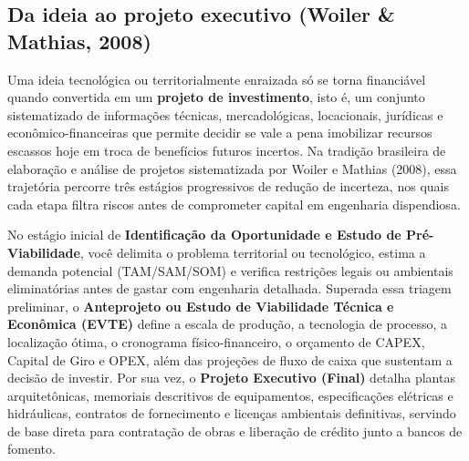 
\subsection{Da ideia ao projeto executivo (Woiler \& Mathias, 2008)}

Uma ideia tecnológica ou territorialmente enraizada só se torna financiável quando convertida em um \textbf{projeto de investimento}, isto é, um conjunto sistematizado de informações técnicas, mercadológicas, locacionais, jurídicas e econômico-financeiras que permite decidir se vale a pena imobilizar recursos escassos hoje em troca de benefícios futuros incertos. Na tradição brasileira de elaboração e análise de projetos sistematizada por Woiler e Mathias (2008), essa trajetória percorre três estágios progressivos de redução de incerteza, nos quais cada etapa filtra riscos antes de comprometer capital em engenharia dispendiosa.

No estágio inicial de \textbf{Identificação da Oportunidade e Estudo de Pré-Viabilidade}, você delimita o problema territorial ou tecnológico, estima a demanda potencial (TAM/SAM/SOM) e verifica restrições legais ou ambientais eliminatórias antes de gastar com engenharia detalhada. Superada essa triagem preliminar, o \textbf{Anteprojeto ou Estudo de Viabilidade Técnica e Econômica (EVTE)} define a escala de produção, a tecnologia de processo, a localização ótima, o cronograma físico-financeiro, o orçamento de CAPEX, Capital de Giro e OPEX, além das projeções de fluxo de caixa que sustentam a decisão de investir. Por sua vez, o \textbf{Projeto Executivo (Final)} detalha plantas arquitetônicas, memoriais descritivos de equipamentos, especificações elétricas e hidráulicas, contratos de fornecimento e licenças ambientais definitivas, servindo de base direta para contratação de obras e liberação de crédito junto a bancos de fomento.

